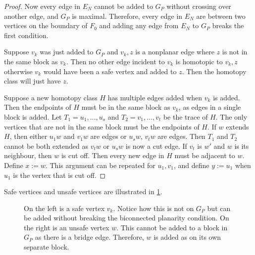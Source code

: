 \begin{proof}
	Now every edge in \(E_N\) cannot be added to \(G_P\) without crossing over another edge, and \(G_P\) is maximal. Therefore, every edge in \(E_N\) are between two vertices on the boundary of $F_0$ and adding any edge from $E_N$ to $G_P$ breaks the first condition.

	Suppose $v_k$ was just added to $G_P$ and $v_k, z$ is a nonplanar edge where $z$ is not in the same block as $v_k$. Then no other edge incident to $v_k$ is homotopic to $v_k, z$ otherwise $v_k$ would have been a safe vertex and added to $z$. Then the homotopy class will just have $z$. 

	Suppose a new homotopy class $H$ has multiple edges added when $v_k$ is added. Then the endpoints of $H$ must be in the same block as $v_k$, as edges in a single block is added. Let $T_1 = u_1, \ldots, u_s$ and $T_2 = v_1, \ldots, v_t$ be the trace of $H$. The only vertices that are not in the same block must be the endpoints of $H$. If $w$ extends $H$, then either $u_1 w$ and $v_1 w$ are edges or $u_s w$, $v_t w$ are edges. Then $T_1$ and $T_2$ cannot be both extended as $v_t w$ or $u_s w$ is now a cut edge. If $v_t$ is $w'$ and $w$ is its neighbour, then $w$ is cut off. Then every new edge in $H$ must be adjacent to $w$. Define $x := w$. This argument can be repeated for $u_1, v_1$, and define $y := u_1$ when $u_1$ is the vertex that is cut off. 
\end{proof}


Safe vertices and unsafe vertices are illustrated in \cref{fig:safe_vertices}.

\begin{figure}[h!]
	\centering
	
	\caption[Safe and unsafe vertices]{On the left is a safe vertex $v_k$. Notice how this is not on $G_P$ but can be added without breaking the biconnected planarity condition. On the right is an unsafe vertex $w$. This cannot be added to a block in $G_P$ as there is a bridge edge. Therefore, $w$ is added as on its own separate block.}\label{fig:safe_vertices}
\end{figure}


